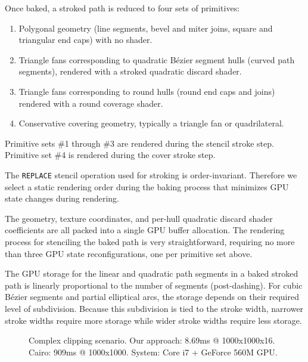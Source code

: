 Once baked, a stroked path is reduced to four sets of primitives:
\begin{enumerate}
  \item Polygonal geometry (line segments, bevel and miter joins, square
  and triangular end caps) with no shader.
  \item Triangle fans corresponding to quadratic B\'{e}zier segment hulls
  (curved path segments), rendered with a stroked quadratic discard
  shader.
  \item Triangle fans corresponding to round hulls (round end caps and
  joins) rendered with a round coverage shader.
  \item Conservative covering geometry, typically a triangle fan or
  quadrilateral.
\end{enumerate}
Primitive sets \#1 through \#3 are rendered during the stencil stroke
step.  Primitive set \#4 is rendered during the cover stroke step.

The {\tt REPLACE} stencil operation used for stroking is order-invariant.
Therefore we select a static rendering order during the baking process
that minimizes GPU state changes during rendering.

The geometry, texture coordinates, and per-hull quadratic discard shader
coefficients are all packed into a single GPU buffer allocation.  The
rendering process for stenciling the baked path is very straightforward,
requiring no more than three GPU state reconfigurations, one per primitive
set above.

The GPU storage for the linear and quadratic path segments in a
baked stroked path is linearly proportional to the number of segments
(post-dashing).  For cubic B\'{e}zier segments and partial elliptical
arcs, the storage depends on their required level of subdivision.
Because this subdivision is tied to the stroke width, narrower stroke
widths require more storage while wider stroke widths require less
storage.
 
\begin{figure}[tb]
  \caption{\label{fig:clip-example} Complex clipping scenario.
  Our approach: 8.69ms @ 1000x1000x16.  Cairo:  909ms @ 1000x1000.
  System: Core i7 + GeForce 560M GPU.}
\end{figure}

